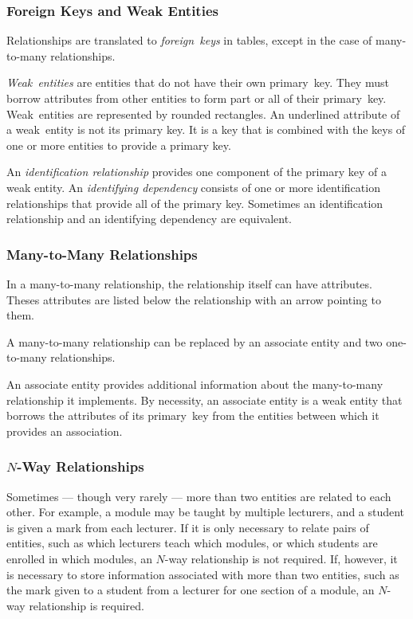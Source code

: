 \subsubsection{Foreign Keys and Weak Entities}

Relationships are translated to \emph{foreign~keys} in tables, except in the case of many-to-many relationships.

\emph{Weak~entities} are entities that do not have their own primary~key.
They must borrow attributes from other entities to form part or all of their primary~key.
Weak~entities are represented by rounded rectangles.
An underlined attribute of a weak~entity is not its primary key.
It is a key that is combined with the keys of one or more entities to provide a primary key.


An \emph{identification relationship} provides one component of the primary key of a weak entity.
An \emph{identifying dependency} consists of one or more identification relationships that provide all of the primary key.
Sometimes an identification relationship and an identifying dependency are equivalent.

\subsubsection{Many-to-Many Relationships}

In a many-to-many relationship, the relationship itself can have attributes.
Theses attributes are listed below the relationship with an arrow pointing to them.


A many-to-many relationship can be replaced by an associate entity and two one-to-many relationships.


An associate entity provides additional information about the many-to-many relationship it implements.
By necessity, an associate entity is a weak entity that borrows the attributes of its primary~key from the entities between which it provides an association.

\subsubsection{\( N \)-Way Relationships}

Sometimes --- though very rarely --- more than two entities are related to each other.
For example, a module may be taught by multiple lecturers, and a student is given a mark from each lecturer.
If it is only necessary to relate pairs of entities, such as which lecturers teach which modules, or which students are enrolled in which modules, an \( N \)-way relationship is not required.
If, however, it is necessary to store information associated with more than two entities, such as the mark given to a student from a lecturer for one section of a module, an \( N \)-way relationship is required.

